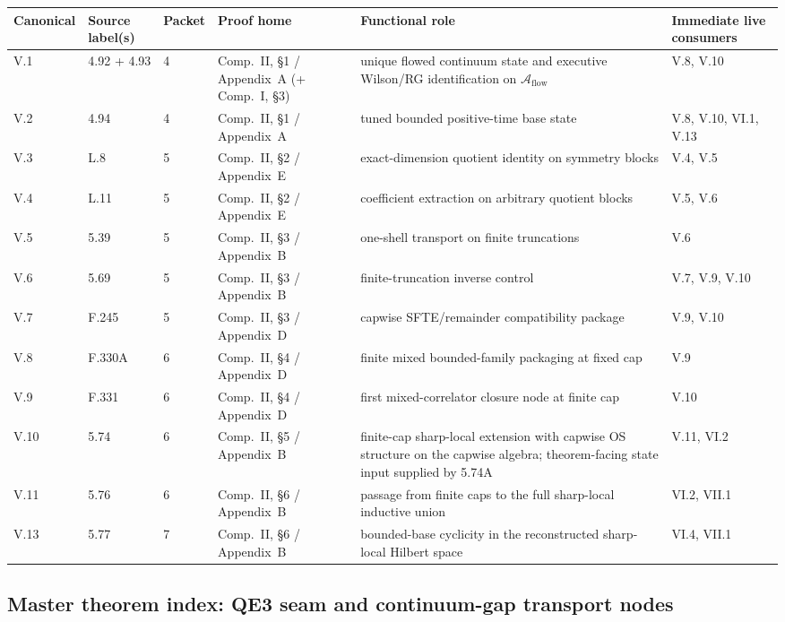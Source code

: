 \begingroup
\scriptsize
\setlength{\tabcolsep}{3pt}
\noindent\begin{tabular}{@{}p{}p{}p{}p{}p{}p{}@{}}
\toprule
\textbf{Canonical} & \textbf{Source label(s)} & \textbf{Packet} & \textbf{Proof home} & \textbf{Functional role} & \textbf{Immediate live consumers}\\
\midrule
V.1 & 4.92 + 4.93 & 4 & Comp.~II, \S1 / Appendix~A (+ Comp.~I, \S3) & unique flowed continuum state and executive Wilson/RG identification on $\mathcal A_{\mathrm{flow}}$ & V.8, V.10\\[0.3em]
V.2 & 4.94 & 4 & Comp.~II, \S1 / Appendix~A & tuned bounded positive-time base state & V.8, V.10, VI.1, V.13\\[0.3em]
V.3 & L.8 & 5 & Comp.~II, \S2 / Appendix~E & exact-dimension quotient identity on symmetry blocks & V.4, V.5\\[0.3em]
V.4 & L.11 & 5 & Comp.~II, \S2 / Appendix~E & coefficient extraction on arbitrary quotient blocks & V.5, V.6\\[0.3em]
V.5 & 5.39 & 5 & Comp.~II, \S3 / Appendix~B & one-shell transport on finite truncations & V.6\\[0.3em]
V.6 & 5.69 & 5 & Comp.~II, \S3 / Appendix~B & finite-truncation inverse control & V.7, V.9, V.10\\[0.3em]
V.7 & F.245 & 5 & Comp.~II, \S3 / Appendix~D & capwise SFTE/remainder compatibility package & V.9, V.10\\[0.3em]
V.8 & F.330A & 6 & Comp.~II, \S4 / Appendix~D & finite mixed bounded-family packaging at fixed cap & V.9\\[0.3em]
V.9 & F.331 & 6 & Comp.~II, \S4 / Appendix~D & first mixed-correlator closure node at finite cap & V.10\\[0.3em]
V.10 & 5.74 & 6 & Comp.~II, \S5 / Appendix~B & finite-cap sharp-local extension with capwise OS structure on the capwise algebra; theorem-facing state input supplied by 5.74A & V.11, VI.2\\[0.3em]
V.11 & 5.76 & 6 & Comp.~II, \S6 / Appendix~B & passage from finite caps to the full sharp-local inductive union & VI.2, VII.1\\[0.3em]
V.13 & 5.77 & 7 & Comp.~II, \S6 / Appendix~B & bounded-base cyclicity in the reconstructed sharp-local Hilbert space & VI.4, VII.1\\
\bottomrule
\end{tabular}
\endgroup

\subsection*{Master theorem index: QE3 seam and continuum-gap transport nodes}

